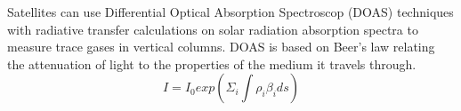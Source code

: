 
Satellites can use  Differential Optical Absorption Spectroscop (DOAS) techniques with radiative transfer calculations on solar radiation absorption spectra to measure trace gases in vertical columns.
DOAS is based on Beer's law relating the attenuation of light to the properties of the medium it travels through. 
$$ I = I_0 exp ( \Sigma_i \int \rho_i \beta_i ds ) $$
